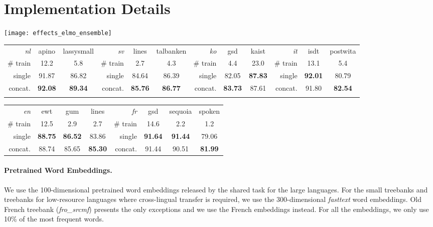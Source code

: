 \documentclass[11pt,a4paper]{article}
\begin{document}
\section{Implementation Details}
\begin{figure*}[t]
	\texttt{[image: effects\_elmo\_ensemble]}
	\caption{The effects of ensemble on dependency parsing.
		Treebanks are sorted according to the number of training sentences from left to right.}\label{fig:elmo-effect-ens}
\end{figure*}
\begin{table*}[t]
	\centering
	\small
	\setlength{\tabcolsep}{5pt}
	\begin{tabular}{rcc || rcc || rcc || rcc}
\textit{nl} & apino & lassysmall & \textit{sv} & lines & talbanken & \textit{ko} & gsd & kaist & \textit{it} & isdt & postwita \\
		\# train & 12.2 & 5.8 & \# train & 2.7 & 4.3 & \# train & 4.4 & 23.0 & \# train & 13.1 & 5.4 \\
		\hline
single & 91.87 & 86.82 & single & 84.64 & 86.39 & single & 82.05 & \textbf{87.83} & single & \textbf{92.01} & 80.79 \\
concat. & \textbf{92.08} & \textbf{89.34} & concat. & \textbf{85.76} & \textbf{86.77} & concat. & \textbf{83.73} & 87.61 & concat.& 91.80 & \textbf{82.54} \\
\vspace*{0.5em}
	\end{tabular}
	\begin{tabular}{rccc || rccc}
		\textit{en} & ewt & gum & lines & \textit{fr} & gsd & sequoia & spoken \\
		\# train & 12.5 & 2.9 & 2.7 & \# train & 14.6 & 2.2 & 1.2\\
		\hline
single & \textbf{88.75} & \textbf{86.52} & 83.86 & single &\textbf{91.64} & \textbf{91.44} & 79.06 \\
concat. & 88.74 & 85.65 & \textbf{85.30} & concat. & 91.44 & 90.51 & \textbf{81.99} \\
	\end{tabular}
	\caption{The developement performance with cross-domain concatenation for languages which has multiple treebanks.
		\textit{single} means training the parser on it own treebank without concatenation.
		\textit{\# train} shows the number of training sentences in the treebank measured in thousand.}\label{tbl:confuse-mat}
\end{table*}

\paragraph{Pretrained Word Embeddings.}
We use the 100-dimensional pretrained word embeddings released by the shared task
for the large languages.
For the small treebanks and treebanks for low-resource languages where cross-lingual transfer is required,
we use the 300-dimensional \textit{fasttext} word embeddings.
Old French treebank (\textit{fro\_srcmf}) presents the only exceptions and we use the French embeddings instead.
For all the embeddings, we only use 10\% of the most frequent words.
\end{document}
